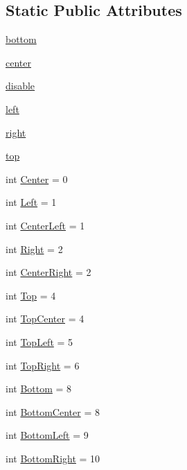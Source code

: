 \subsection*{Static Public Attributes}
\begin{DoxyCompactItemize}
\item 
\hyperlink{classvlc_1_1_position_a1e1e13bec2639fca768af56dd3b64e9a}{bottom}
\item 
\hyperlink{classvlc_1_1_position_a02389a9bda512aa8f8a3345f4fa27f25}{center}
\item 
\hyperlink{classvlc_1_1_position_abe996ab89e7c40a1fd331e632b99bafa}{disable}
\item 
\hyperlink{classvlc_1_1_position_a58c76f848f15df202254c1daec468567}{left}
\item 
\hyperlink{classvlc_1_1_position_a25331d5f9601b8cb1ce57490930d7c01}{right}
\item 
\hyperlink{classvlc_1_1_position_a8aab264665f2085687d9eeca4c67a691}{top}
\item 
int \hyperlink{classvlc_1_1_position_aa00ece42e852ea514d8f35acde89b995}{Center} = 0
\item 
int \hyperlink{classvlc_1_1_position_ab6be70c549c5ceae2d6cb6695a713412}{Left} = 1
\item 
int \hyperlink{classvlc_1_1_position_a3721b26c0c33c5c1cf190b1891ae8905}{Center\+Left} = 1
\item 
int \hyperlink{classvlc_1_1_position_ace4946ecd4a66e40705cc19b4bd69723}{Right} = 2
\item 
int \hyperlink{classvlc_1_1_position_a5d6179ee2bccb85e999f556a7c9a0876}{Center\+Right} = 2
\item 
int \hyperlink{classvlc_1_1_position_a0ce92b11ec313a08cc69dadd05bd9cd0}{Top} = 4
\item 
int \hyperlink{classvlc_1_1_position_aa94ab0066182fefd066f47a4b5e15ec2}{Top\+Center} = 4
\item 
int \hyperlink{classvlc_1_1_position_a8bcfa20ce6896edfe82ea54a9066d80e}{Top\+Left} = 5
\item 
int \hyperlink{classvlc_1_1_position_a89cd4d2f7982a85d52f31a6843bf435b}{Top\+Right} = 6
\item 
int \hyperlink{classvlc_1_1_position_a48ff243e9604de98f95ce6a3553ce350}{Bottom} = 8
\item 
int \hyperlink{classvlc_1_1_position_aa7840fae6c0e8c1c66a9d17371f084f3}{Bottom\+Center} = 8
\item 
int \hyperlink{classvlc_1_1_position_a3a273a1ffc84209870abf07ec0b5b561}{Bottom\+Left} = 9
\item 
int \hyperlink{classvlc_1_1_position_a4933837db1b048061f079b1c473e5034}{Bottom\+Right} = 10
\end{DoxyCompactItemize}
